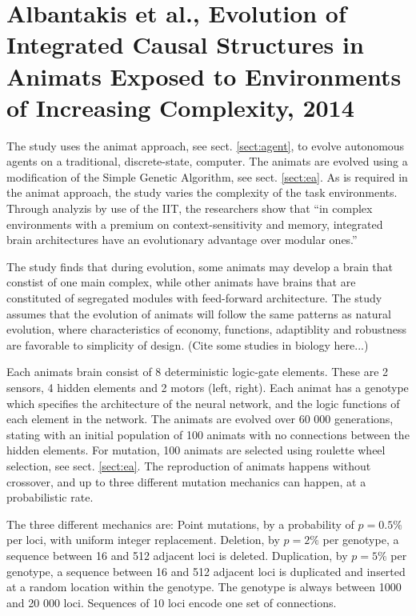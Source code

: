 \section{Albantakis et al., Evolution of Integrated Causal Structures in Animats Exposed to Environments of Increasing Complexity, 2014}
The study uses the animat approach, see sect. \vref{sect:agent}, to evolve autonomous agents on a traditional, discrete-state, computer.
The animats are evolved using a modification of the Simple Genetic Algorithm, see sect. \vref{sect:ea}.
As is required in the animat approach, the study varies the complexity of the task environments.
Through analyzis by use of the IIT, the researchers show that ``in complex environments with a premium on context-sensitivity and memory, integrated brain architectures have an evolutionary advantage over modular ones.''\cite{albantakis_evolution_2014-1}

The study finds that during evolution, some animats may develop a brain that constist of one main complex, while other animats have brains that are constituted of segregated modules with feed-forward architecture. The study assumes that the evolution of animats will follow the same patterns as natural evolution, where characteristics of economy, functions, adaptiblity and robustness are favorable to simplicity of design. (Cite some studies in biology here...)

Each animats brain consist of 8 deterministic logic-gate elements. These are 2 sensors, 4 hidden elements and 2 motors (left, right).
Each animat has a genotype which specifies the architecture of the neural network, and the logic functions of each element in the network.
The animats are evolved over 60 000 generations, stating with an initial population of 100 animats with no connections between the hidden elements.
For mutation, 100 animats are selected using roulette wheel selection, see sect. \vref{sect:ea}.
The reproduction of animats happens without crossover, and up to three different mutation mechanics can happen, at a probabilistic rate.\cite{albantakis_evolution_2014}

The three different mechanics are: Point mutations, by a probability of $p = 0.5 \%$ per loci, with uniform integer replacement. Deletion, by $p = 2\%$ per genotype, a sequence between 16 and 512 adjacent loci is deleted. Duplication, by $p = 5\%$ per genotype, a sequence between 16 and 512 adjacent loci is duplicated and inserted at a random location within the genotype.
The genotype is always between 1000 and 20 000 loci. Sequences of 10 loci encode one set of connections.\cite{albantakis_evolution_2014}

